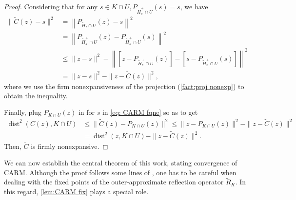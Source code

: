 \documentclass[smallextended,numbook,nospthms]{svjour3}
\theoremstyle{plain}
\theoremstyle{definition}
\DeclareMathOperator{\dist}{dist}
\begin{document}
\begin{proof}
	Considering that for any $s \in K \cap U, P_{\tilde{H}_{z}^{+} \cap U}(s)=s$, we have
	\begin{align}
	\|\tilde{C}(z)-s\|^{2}& =\left\|P_{\tilde{H}_{z} \cap U}(z)-s\right\|^{2} \\
		&=\left\|P_{\tilde{H}_{z}^{+} \cap U}(z)-P_{\tilde{H}_{z}^{+} \cap U}(s)\right\|^{2} \\
		&\leq\|z-s\|^{2}-\left\|\left[z-P_{\tilde{H}_{z}^{+} \cap U}(z)\right]-\left[s-P_{\tilde{H}_{z}^{+} \cap U}(s)\right]\right\|^{2} \\
		&=\|z-s\|^{2}-\|z-\tilde{C}(z)\|^{2},
	\end{align}
	where we use the firm nonexpansiveness of the projection (\cref{fact:proj nonexp}) to obtain the inequality.
	
	Finally, plug $P_{K \cap U}(z)$ in for $s$ in \cref{eq: CARM fqne} so as to get
	\begin{align}
		\dist^{2}(C(z), K \cap U) & \leq\|\tilde{C}(z)-P_{K \cap U}(z)\|^{2} \leq\|z-P_{K \cap U}(z)\|^{2}-\|z-\tilde{C}(z)\|^{2} \\
		&=\dist^{2}(z, K \cap U)-\|z-\tilde{C}(z)\|^{2}.
	\end{align}
	Then, $\tilde{C}$ is firmly nonexpansive.
\end{proof}

We can now establish the central theorem of this work, stating convergence of CARM. Although the proof follows some lines of \cite[Theorem 1]{Behling:2020}, one has to be careful when dealing with the fixed points of the outer-approximate reflection operator $\tilde{R}_{K}$. In this regard, \cref{lem:CARM fix} plays a special role.
\end{document}
